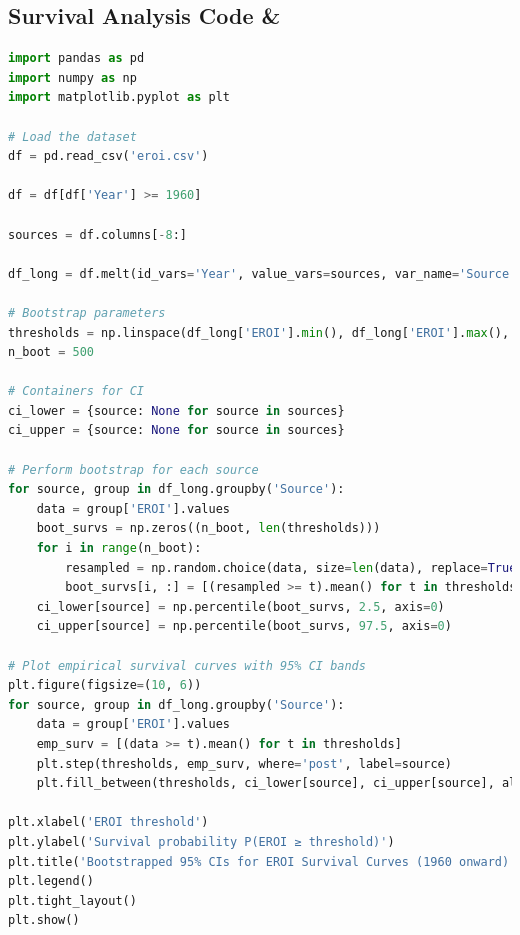 \documentclass[a4paper,12pt]{article}
\begin{document}
\subsection{Survival Analysis Code &}
\begin{lstlisting}[language=Python, caption={Python code for bootstrapped 95\% CIs for EROI survival curves}, label={lst:eroi_code}]
import pandas as pd
import numpy as np
import matplotlib.pyplot as plt

# Load the dataset
df = pd.read_csv('eroi.csv')

df = df[df['Year'] >= 1960]

sources = df.columns[-8:]

df_long = df.melt(id_vars='Year', value_vars=sources, var_name='Source', value_name='EROI').dropna()

# Bootstrap parameters
thresholds = np.linspace(df_long['EROI'].min(), df_long['EROI'].max(), 100)
n_boot = 500

# Containers for CI
ci_lower = {source: None for source in sources}
ci_upper = {source: None for source in sources}

# Perform bootstrap for each source
for source, group in df_long.groupby('Source'):
    data = group['EROI'].values
    boot_survs = np.zeros((n_boot, len(thresholds)))
    for i in range(n_boot):
        resampled = np.random.choice(data, size=len(data), replace=True)
        boot_survs[i, :] = [(resampled >= t).mean() for t in thresholds]
    ci_lower[source] = np.percentile(boot_survs, 2.5, axis=0)
    ci_upper[source] = np.percentile(boot_survs, 97.5, axis=0)

# Plot empirical survival curves with 95% CI bands
plt.figure(figsize=(10, 6))
for source, group in df_long.groupby('Source'):
    data = group['EROI'].values
    emp_surv = [(data >= t).mean() for t in thresholds]
    plt.step(thresholds, emp_surv, where='post', label=source)
    plt.fill_between(thresholds, ci_lower[source], ci_upper[source], alpha=0.3)

plt.xlabel('EROI threshold')
plt.ylabel('Survival probability P(EROI ≥ threshold)')
plt.title('Bootstrapped 95% CIs for EROI Survival Curves (1960 onward)')
plt.legend()
plt.tight_layout()
plt.show()
\end{lstlisting}
\end{document}
